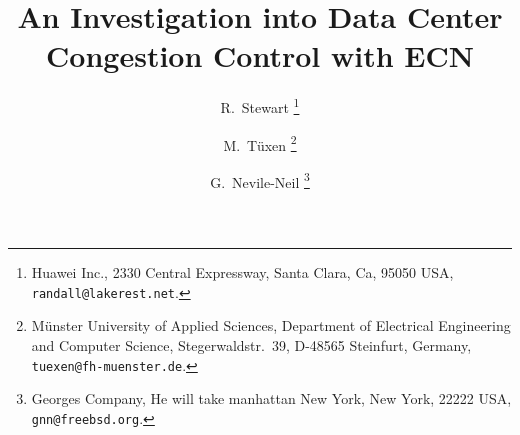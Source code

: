 \documentclass[12pt]{article}
\begin{document}
%
%
\title{An Investigation into Data Center Congestion Control with ECN}
\author{R.~Stewart%
        \thanks{Huawei Inc.,
                2330 Central Expressway,
                Santa Clara, Ca, 95050
                USA,
                \texttt{randall@lakerest.net}.}
	 \and
	M.~T\"uxen%
        \thanks{M\"unster University of Applied Sciences,
                Department of Electrical Engineering
                and Computer Science,
                Stegerwaldstr.~39,
                D-48565 Steinfurt,
                Germany,
                \texttt{tuexen@fh-muenster.de}.}
 	\and
 	G.~Nevile-Neil%
 	\thanks{Georges Company,
	             He will take manhattan
	             New York, New York, 22222
	             USA,
	             \texttt{gnn@freebsd.org}.}
}

\maketitle
\end{document}
